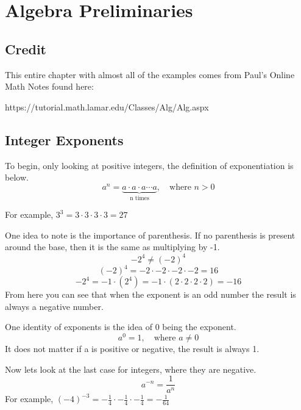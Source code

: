 \documentclass[12pt, letterpaper, oneside]{book}
\begin{document}
\chapter{Algebra Preliminaries}
\section*{Credit}
This entire chapter with almost all of the examples comes from Paul's Online Math Notes found here:

https://tutorial.math.lamar.edu/Classes/Alg/Alg.aspx

\section{Integer Exponents}
To begin, only looking at positive integers, the definition of exponentiation is below.
\begin{equation}
    a^n = \underbrace{ a \cdot a \cdot  a\cdots a}_\textrm{n times}, \quad \text{where } n > 0
\end{equation}

For example, $ 3^3 = 3 \cdot 3 \cdot 3 \cdot 3 = 27 $

One idea to note is the importance of parenthesis. If no parenthesis is present around the base, then it is the same as multiplying by -1.
\[-2^4 \neq (-2)^4 \]
\[(-2)^4 = -2 \cdot -2 \cdot -2 \cdot -2 = 16\] 
\[-2^4 = -1 \cdot (2^4) = -1 \cdot (2 \cdot 2 \cdot 2 \cdot 2) = -16\]
From here you can see that when the exponent is an odd number the result is always a negative number.

One identity of exponents is the idea of 0 being the exponent.
\begin{equation}
    a^0 = 1, \quad \text{where } a \neq 0
\end{equation}
It does not matter if a is positive or negative, the result is always 1.

Now lets look at the last case for integers, where they are negative.
\begin{equation}
    a^{-n} = \frac{1}{a^n}
\end{equation}
For example, $(-4)^{-3} = -\frac{1}{4} \cdot -\frac{1}{4} \cdot -\frac{1}{4} = -\frac{1}{64}$
\end{document}
